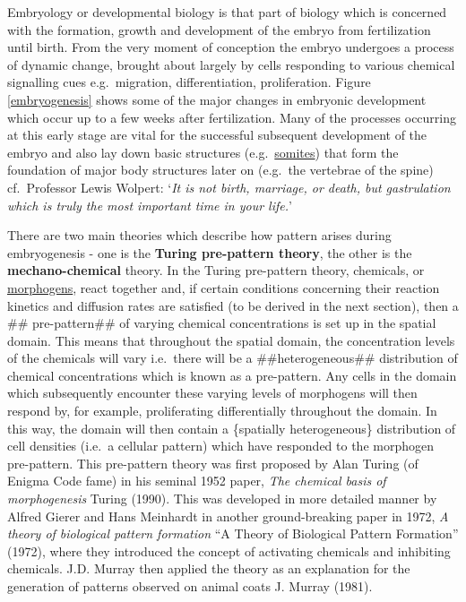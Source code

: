 \documentclass[
  letterpaper,
  DIV=11,
  numbers=noendperiod]{scrreprt}
\theoremstyle{plain}
\theoremstyle{definition}
\theoremstyle{plain}
\theoremstyle{remark}
\begin{document}
Embryology or developmental biology is that part of biology which is
concerned with the formation, growth and development of the embryo from
fertilization until birth. From the very moment of conception the embryo
undergoes a process of dynamic change, brought about largely by cells
responding to various chemical signalling cues e.g.~migration,
differentiation, proliferation. Figure \ref{embryogenesis} shows some of
the major changes in embryonic development which occur up to a few weeks
after fertilization. Many of the processes occurring at this early stage
are vital for the successful subsequent development of the embryo and
also lay down basic structures
(e.g.~\href{https://en.wikipedia.org/wiki/Somite}{somites}) that form
the foundation of major body structures later on (e.g.~the vertebrae of
the spine) cf.~Professor Lewis Wolpert: `\emph{It is not birth,
marriage, or death, but gastrulation which is truly the most important
time in your life.}'

There are two main theories which describe how pattern arises during
embryogenesis - one is the \textbf{Turing pre-pattern theory}, the other
is the \textbf{mechano-chemical} theory. In the Turing pre-pattern
theory, chemicals, or
\href{https://en.wikipedia.org/wiki/Morphogen}{morphogens}, react
together and, if certain conditions concerning their reaction kinetics
and diffusion rates are satisfied (to be derived in the next section),
then a \#\# pre-pattern\#\# of varying chemical concentrations is set up
in the spatial domain. This means that throughout the spatial domain,
the concentration levels of the chemicals will vary i.e.~there will be a
\#\#heterogeneous\#\# distribution of chemical concentrations which is
known as a pre-pattern. Any cells in the domain which subsequently
encounter these varying levels of morphogens will then respond by, for
example, proliferating differentially throughout the domain. In this
way, the domain will then contain a \{spatially heterogeneous\}
distribution of cell densities (i.e.~a cellular pattern) which have
responded to the morphogen pre-pattern. This pre-pattern theory was
first proposed by Alan Turing (of Enigma Code fame) in his seminal 1952
paper, \emph{The chemical basis of morphogenesis} Turing (1990). This
was developed in more detailed manner by Alfred Gierer and Hans
Meinhardt in another ground-breaking paper in 1972, \emph{A theory of
biological pattern formation} {``A Theory of Biological Pattern
Formation''} (1972), where they introduced the concept of activating
chemicals and inhibiting chemicals. J.D. Murray then applied the theory
as an explanation for the generation of patterns observed on animal
coats J. Murray (1981).
\end{document}
